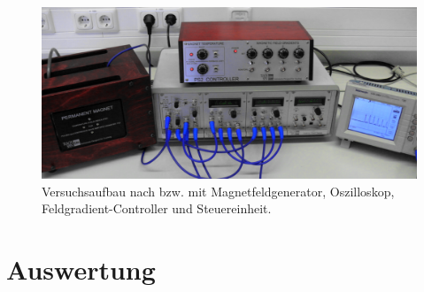 \documentclass[numbers=noenddot,a4paper,notitlepage,twoside,BCOR15mm]{scrartcl}
\begin{document}
			\begin{figure}[h]
				\centering
				\includegraphics[width=\textwidth]{aufbau.png}
				\caption{Versuchsaufbau nach \cite{UAchenNMR} bzw. \cite{EMAUGreifswaldNMR} mit Magnetfeldgenerator, Oszilloskop, Feldgradient-Controller und Steuereinheit.}
				\label{img:aufbau}
			\end{figure}

	\clearpage
	\section{Auswertung}\label{sec:auswert}
\end{document}

